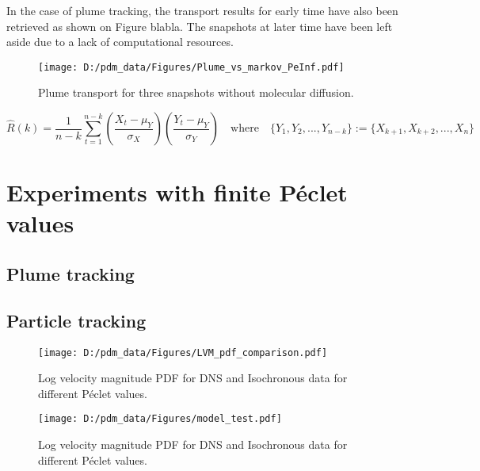 In the case of plume tracking, the transport results for early time have also been retrieved as shown on Figure blabla. The snapshots at later time have been left aside due to a lack of computational resources.

\begin{figure}
	\centering
	\texttt{[image: D:/pdm\_data/Figures/Plume\_vs\_markov\_PeInf.pdf]}
	\caption{Plume transport for three snapshots without molecular diffusion.}
	\label{fig:lvm_pdf_peinf}
\end{figure}

$$
\hat R(k) = \frac{1}{n-k} \sum_{t=1}^{n-k} \left(\frac{X_t-\mu_Y}{\sigma_X}\right)\left(\frac{Y_t-\mu_Y}{\sigma_Y}\right) \quad\textrm{where}\quad \{Y_1,Y_2,...,Y_{n-k}\} := \{X_{k+1},X_{k+2},...,X_{n}\} 
$$

\chapter{Experiments with finite Péclet values}

\section{Plume tracking}

\section{Particle tracking}


\begin{figure}
	\centering
	\texttt{[image: D:/pdm\_data/Figures/LVM\_pdf\_comparison.pdf]}
	\caption{Log velocity magnitude PDF for DNS and Isochronous data for different Péclet values.}
	\label{fig:lvm_pdf_peinf}
\end{figure}

\begin{figure}
	\centering
	\texttt{[image: D:/pdm\_data/Figures/model\_test.pdf]}
	\caption{Log velocity magnitude PDF for DNS and Isochronous data for different Péclet values.}
	\label{fig:lvm_pdf_peinf}
\end{figure}